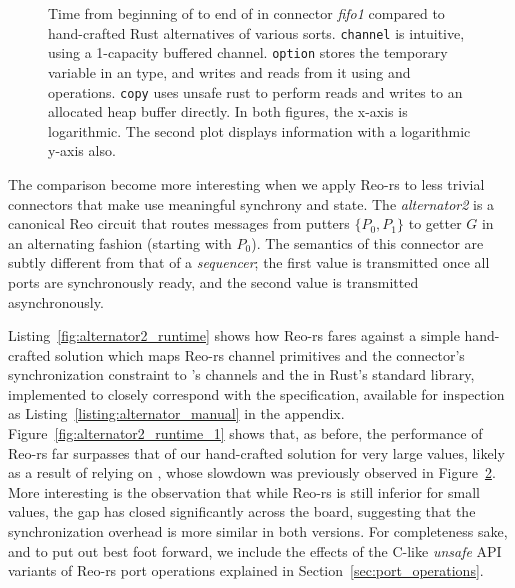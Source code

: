 \begin{figure}
{\begin{subfigure}[b]{0.63\textwidth}
			\caption{}
			\label{fig:exper_rtt_1}
		\end{subfigure}%
	}
	\caption[Performance of fifo1 connector vs.\ hand-crafted Rust code.]{Time from beginning of  to end of  in connector \textit{fifo1} compared to hand-crafted Rust alternatives of various sorts. \texttt{channel} is intuitive, using a  1-capacity buffered channel. \texttt{option} stores the temporary variable in an  type, and writes and reads from it using  and  operations. \texttt{copy} uses unsafe rust to perform reads and writes to an allocated heap buffer directly. In both figures, the x-axis is logarithmic. The second plot displays information with a logarithmic y-axis also.}
	\label{fig:exper_rtt}
\end{figure}

The comparison become more interesting when we apply Reo-rs to less trivial connectors that make use meaningful synchrony and state. The \textit{alternator2} is a canonical Reo circuit that routes messages from putters $\{P_0, P_1\}$ to getter $G$ in an alternating fashion (starting with $P_0$). The semantics of this connector are subtly different from that of a \textit{sequencer}; the first value is transmitted once all ports are synchronously ready, and the second value is transmitted asynchronously.

Listing~\ref{fig:alternator2_runtime} shows how Reo-rs fares against a simple hand-crafted solution which maps Reo-rs channel primitives and the connector's synchronization constraint to 's channels and the  in Rust's standard library, implemented to closely correspond with the specification, available for inspection as Listing~\ref{listing:alternator_manual} in the appendix. Figure~\ref{fig:alternator2_runtime_1} shows that, as before, the performance of Reo-rs far surpasses that of our hand-crafted solution for very large values, likely as a result of relying on , whose slowdown was previously observed in Figure~\ref{fig:exper_rtt}. More interesting is the observation that while Reo-rs is still inferior for small values, the gap has closed significantly across the board, suggesting that the synchronization overhead is more similar in both versions. For completeness sake, and to put out best foot forward, we include the effects of the C-like \textit{unsafe} API variants of Reo-rs port operations explained in Section~\ref{sec:port_operations}.  

